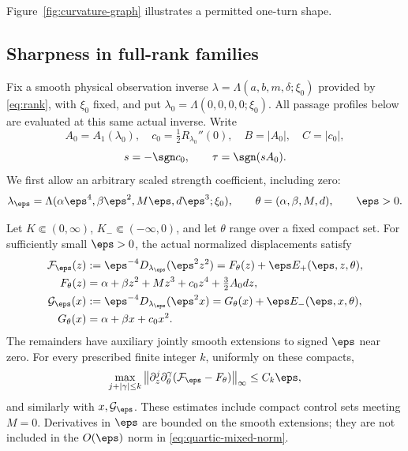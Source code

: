 Figure~\ref{fig:curvature-graph} illustrates a permitted one-turn shape.



\subsection{Sharpness in full-rank families}\label{subsec:single-scale-sharpness}

Fix a smooth physical observation inverse
\(\lambda=\Lambda(a,b,m,\delta;\xi_0)\) provided by \eqref{eq:rank},
with \(\xi_0\) fixed, and put
\(\lambda_0=\Lambda(0,0,0,0;\xi_0)\). All passage profiles below
are evaluated at this same actual inverse. Write
\[
 A_0=A_1(\lambda_0),\quad
 c_0=\tfrac12R_{\lambda_0}''(0),\quad
 B=|A_0|,\quad C=|c_0|,
\]
\[
 s=-\sgn c_0,\qquad \tau=\sgn(sA_0).
\]
We first allow an arbitrary scaled strength coefficient, including zero:
\begin{equation}\label{eq:weighted-general-controls}
 \lambda_\eps=\Lambda(\alpha\eps^4,\beta\eps^2,
                         M\eps,d\eps^3;\xi_0),\qquad
 \theta=(\alpha,\beta,M,d),\qquad \eps>0.
\end{equation}

\begin{lemma}\label{lem:weighted-quartic}
Let \(K\Subset(0,\infty)\), \(K_-\Subset(-\infty,0)\), and let
\(\theta\) range over a fixed compact set. For sufficiently small
\(\eps>0\), the actual normalized displacements satisfy
\begin{align}
 \mathcal F_\eps(z)&:=\eps^{-4}D_{\lambda_\eps}(\eps^2z^2)
 =F_\theta(z)+\eps E_+(\eps,z,\theta),\label{eq:quartic-limit}\\
 F_\theta(z)&=\alpha+\beta z^2+Mz^3+c_0z^4+\tfrac32A_0dz,\notag\\
 \mathcal G_\eps(x)&:=\eps^{-4}D_{\lambda_\eps}(\eps^2x)
 =G_\theta(x)+\eps E_-(\eps,x,\theta),
 \label{eq:quartic-negative-limit}\\
 G_\theta(x)&=\alpha+\beta x+c_0x^2.\notag
\end{align}
The remainders have auxiliary jointly smooth extensions to signed
\(\eps\) near zero.
For every prescribed finite integer \(k\), uniformly on these compacts,
\begin{equation}\label{eq:quartic-mixed-norm}
 \max_{j+|\gamma|\le k}
 \left\|\partial_z^j\partial_\theta^\gamma
                 (\mathcal F_\eps-F_\theta)\right\|_\infty\le C_k\eps,
\end{equation}
and similarly with \(x,\mathcal G_\eps\). These estimates include
compact control sets meeting \(M=0\). Derivatives in \(\eps\) are
bounded on the smooth extensions; they are not included in the \(O(\eps)\) norm in
\eqref{eq:quartic-mixed-norm}.
\end{lemma}

